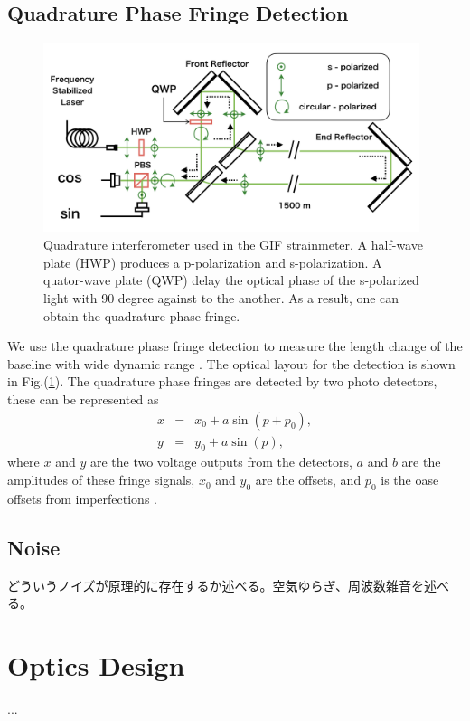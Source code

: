 \subsection{Quadrature Phase Fringe Detection}
\begin{figure}[h]
  \begin{center}
    \includegraphics[width=11.0cm]{./img_chap4/img413.png}
    \caption{Quadrature interferometer used in the GIF strainmeter. A half-wave plate (HWP) produces a p-polarization and s-polarization. A quator-wave plate (QWP) delay the optical phase of the s-polarized light with 90 degree against to the another. As a result, one can obtain the quadrature phase fringe.}\label{img:img413}
  \end{center}
\end{figure}

We use the quadrature phase fringe detection to measure the length change of the baseline with wide dynamic range \cite{bobroff1993recent}. The optical layout for the detection is shown in Fig.(\ref{img:img413}). The quadrature phase fringes are detected by two photo detectors, these can be represented as
\begin{eqnarray}
  x &=& x_0 + a \sin(p+p_0), \\
  y &=& y_0 + a \sin(p),
\end{eqnarray}
where $x$ and $y$ are the two voltage outputs from the detectors, $a$ and $b$ are the amplitudes of these fringe signals, $x_0$ and $y_0$ are the offsets, and $p_0$ is the oase offsets from imperfections \cite{zumberge2004resolving}.



\subsection{Noise}


どういうノイズが原理的に存在するか述べる。空気ゆらぎ、周波数雑音を述べる。


\section{Optics Design} %
...\\

